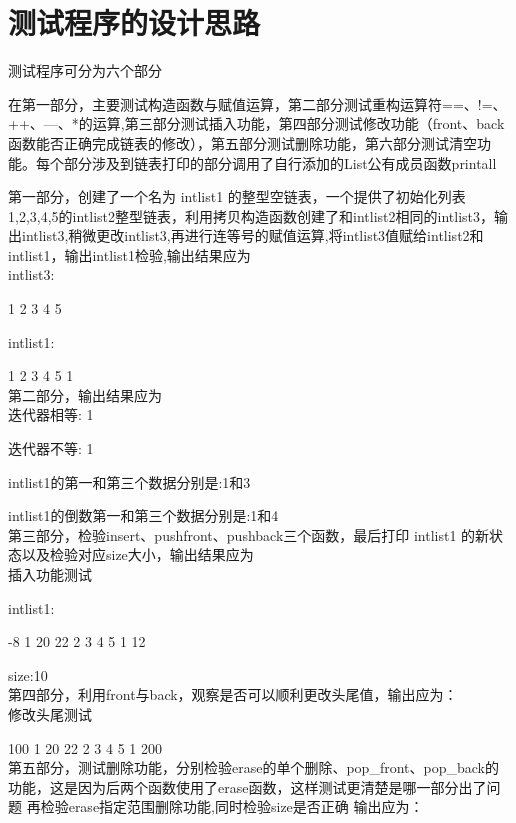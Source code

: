 \documentclass[UTF8]{ctexart}
\begin{document}
\pagestyle{fancy}
\fancyhead{}

\section{测试程序的设计思路}
测试程序可分为六个部分

在第一部分，主要测试构造函数与赋值运算，第二部分测试重构运算符==、!=、++、---、*的运算,第三部分测试插入功能，第四部分测试修改功能（front、back函数能否正确完成链表的修改），第五部分测试删除功能，第六部分测试清空功能。每个部分涉及到链表打印的部分调用了自行添加的List公有成员函数printall

第一部分，创建了一个名为 intlist1 的整型空链表，一个提供了初始化列表 {1,2,3,4,5}的intlist2整型链表，利用拷贝构造函数创建了和intlist2相同的intlist3，输出intlist3,稍微更改intlist3,再进行连等号的赋值运算,将intlist3值赋给intlist2和intlist1，输出intlist1检验,输出结果应为
\\

intlist3:

1 2 3 4 5 

intlist1:

1 2 3 4 5 1
\\

第二部分，输出结果应为
\\

迭代器相等: 1

迭代器不等: 1

intlist1的第一和第三个数据分别是:1和3

intlist1的倒数第一和第三个数据分别是:1和4
\\

第三部分，检验insert、pushfront、pushback三个函数，最后打印 intlist1 的新状态以及检验对应size大小，输出结果应为
\\

插入功能测试

intlist1:

-8 1 20 22 2 3 4 5 1 12 

size:10
\\

第四部分，利用front与back，观察是否可以顺利更改头尾值，输出应为：
\\

修改头尾测试

100 1 20 22 2 3 4 5 1 200 
\\

第五部分，测试删除功能，分别检验erase的单个删除、pop\_front、pop\_back的功能，这是因为后两个函数使用了erase函数，这样测试更清楚是哪一部分出了问题
再检验erase指定范围删除功能,同时检验size是否正确
输出应为：
\\
\end{document}
